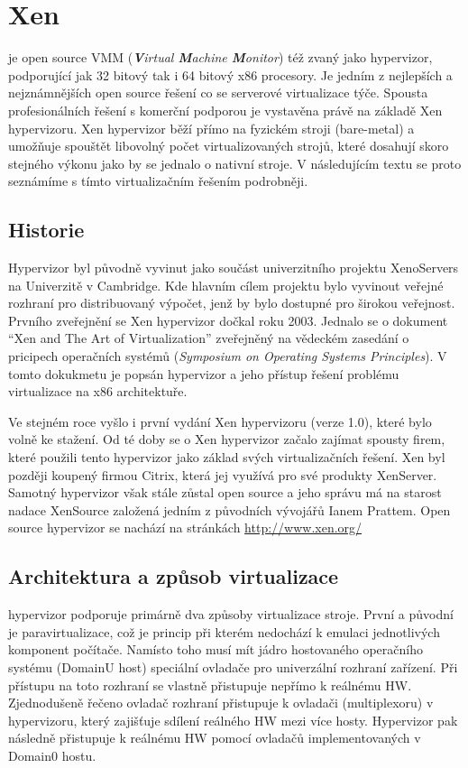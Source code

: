 \section{Xen\textsuperscript{\textregistered}}
\xen je open source VMM (\textit{\textbf{V}irtual \textbf{M}achine \textbf{M}onitor}) též zvaný jako hypervizor, podporující jak 32 bitový tak i 64 bitový x86 procesory. Je jedním z nejlepších a nejznámnějších open source řešení co se serverové virtualizace týče. Spousta profesionálních řešení s komerční podporou je vystavěna právě na základě Xen hypervizoru. Xen hypervizor běží přímo na fyzickém stroji (bare-metal) a umožňuje spouštět libovolný počet virtualizovaných strojů, které dosahují skoro stejného výkonu jako by se jednalo o nativní stroje. V následujícím textu se proto seznámíme s tímto virtualizačním řešením podrobněji.

\subsection{Historie}
Hypervizor \xen byl původně vyvinut jako součást univerzitního projektu XenoServers na Univerzitě v Cambridge. Kde hlavním cílem projektu bylo vyvinout veřejné rozhraní pro distribuovaný výpočet, jenž by bylo dostupné pro širokou veřejnost. Prvního zveřejnění se Xen hypervizor dočkal roku 2003. Jednalo se o dokument "`Xen and The Art of Virtualization"' zveřejněný na vědeckém zasedání o pricipech operačních systémů (\emph{Symposium on Operating Systems Principles}). V tomto dokukmetu je popsán hypervizor a jeho přístup řešení problému virtualizace na x86 architektuře.

Ve stejném roce vyšlo i první vydání Xen hypervizoru (verze 1.0), které bylo volně ke stažení. Od té doby se o Xen hypervizor začalo zajímat spousty firem, které použili tento hypervizor jako základ svých virtualizačních řešení. Xen byl později koupený firmou Citrix, která jej využívá pro své produkty XenServer. Samotný hypervizor však stále zůstal open source a jeho správu má na starost nadace XenSource založená jedním z původních vývojářů Ianem Prattem. Open source hypervizor se nachází na stránkách \url{http://www.xen.org/ }

\subsection{Architektura a způsob virtualizace}
\xen hypervizor podporuje primárně dva způsoby virtualizace stroje. První a původní je paravirtualizace, což je princip při kterém nedochází k emulaci jednotlivých komponent počítače. Namísto toho musí mít jádro hostovaného operačního systému (DomainU host) speciální ovladače pro univerzální rozhraní zařízení. Při přístupu na toto rozhraní se vlastně přistupuje nepřímo k reálnému HW. Zjednodušeně řečeno ovladač rozhraní přistupuje k ovladači (multiplexoru) v hypervizoru, který zajišťuje sdílení reálného HW mezi více hosty. Hypervizor pak následně přistupuje k reálnému HW pomocí ovladačů implementovaných v Domain0 hostu.

